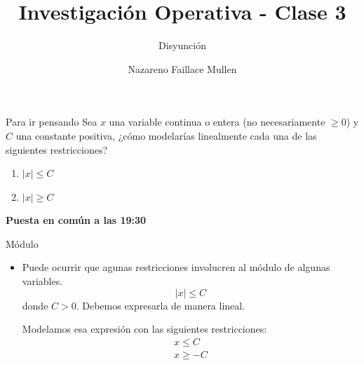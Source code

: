 \documentclass[10pt, aspectratio=169]{beamer}
\title{Investigación Operativa - Clase 3}
\subtitle{Disyunción}
\date{}
\author{Nazareno Faillace Mullen}
\institute{Departamento de Matemática - FCEN - UBA}
\begin{document}
\maketitle



\begin{frame}{Para ir pensando}
    \large
    Sea $x$ una variable continua o entera (no necesariamente $\geq 0$) y
    $C$ una constante positiva, ¿cómo modelarías linealmente cada una de las siguientes
    restricciones?
    \begin{enumerate}
        \item $|x|\leq C$
        \item $|x|\geq C$
    \end{enumerate}

    \centering
    \textbf{Puesta en común a las 19:30}
\end{frame}

\begin{frame}{Módulo}
    \begin{itemize}
        \item
        Puede ocurrir que agunas restricciones involucren al módulo de algunas variables.
        $$|x|\leq C$$
        donde $C> 0$. Debemos expresarla de manera lineal.

        Modelamos esa expresión con las siguientes restricciones:
        $$\begin{array}{l}
            x\leq C  \\
            x\geq -C
        \end{array}$$
    \end{itemize}
\end{frame}
\end{document}
